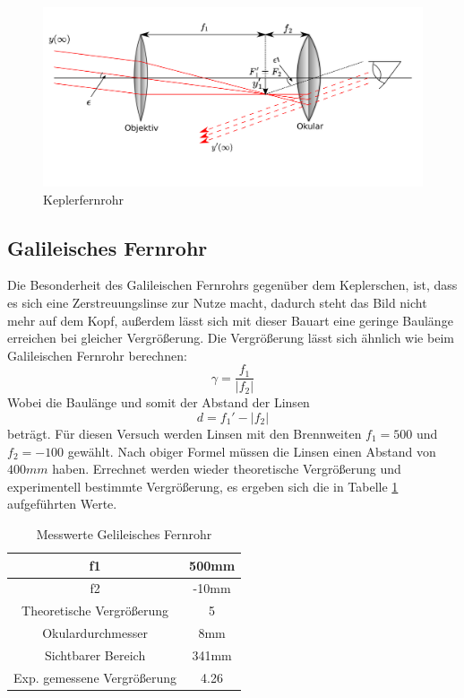 \begin{figure}
    \centering
    \includegraphics[scale=0.8]{Geometrische_Optik/Protokoll/fig/Keplerfernrohr.png}
    \caption{Keplerfernrohr}
    \label{fig:Keplerfernrohr}
\end{figure}

\subsection{Galileisches Fernrohr}
Die Besonderheit des Galileischen Fernrohrs gegenüber dem Keplerschen, ist, dass es sich eine Zerstreuungslinse zur Nutze macht, dadurch steht das Bild nicht mehr auf dem Kopf, außerdem lässt sich mit dieser Bauart eine geringe Baulänge erreichen bei gleicher Vergrößerung. Die Vergrößerung lässt sich ähnlich wie beim Galileischen Fernrohr berechnen: $$ \gamma = \frac{f_1}{|f_2|} $$ Wobei die Baulänge und somit der Abstand der Linsen $$ d = f_1' - |f_2| $$ beträgt. Für diesen Versuch werden Linsen mit den Brennweiten $f_1 = 500$ und $f_2 = -100$ gewählt. Nach obiger Formel müssen die Linsen einen Abstand von $400mm$ haben. Errechnet werden wieder theoretische Vergrößerung und experimentell bestimmte Vergrößerung, es ergeben sich die in Tabelle \ref{tab:Tabellegalileo} aufgeführten Werte.

\begin{table}[h]
    \centering
\begin{tabular}{|c|c|}
	\hline
	f1 & 500mm \\
	\hline
	f2 & -10mm \\
	\hline
	Theoretische Vergrößerung & 5 \\
	\hline
	Okulardurchmesser & 8mm \\
	\hline
	Sichtbarer Bereich & 341mm \\
	\hline
	Exp. gemessene Vergrößerung & 4.26 \\
	\hline
    \end{tabular}
    \caption{Messwerte Gelileisches Fernrohr}
    \label{tab:Tabellegalileo}
\end{table}

